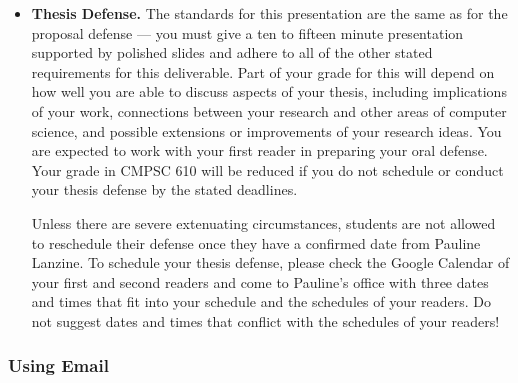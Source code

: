 \begin{itemize}
  \item{\bf Thesis Defense.} The standards for this presentation are the same as for the proposal defense --- you must
    give a ten to fifteen minute presentation supported by polished slides and adhere to all of the other stated
    requirements for this deliverable.  Part of your grade for this will depend on how well you are able to discuss
    aspects of your thesis, including implications of your work, connections between your research and other areas of
    computer science, and possible extensions or improvements of your research ideas.  You are expected to work with
    your first reader in preparing your oral defense.  Your grade in CMPSC 610 will be reduced if you do not schedule or
    conduct your thesis defense by the stated deadlines.

    Unless there are severe extenuating circumstances, students are not allowed to reschedule their defense once they
    have a confirmed date from Pauline Lanzine. To schedule your thesis defense, please check the Google Calendar of
    your first and second readers and come to Pauline's office with three dates and times that fit into your schedule
    and the schedules of your readers. Do not suggest dates and times that conflict with the schedules of your readers!

\end{itemize}



\vspace*{-.2in}
\subsubsection*{Using Email}
\vspace*{-.05in}

